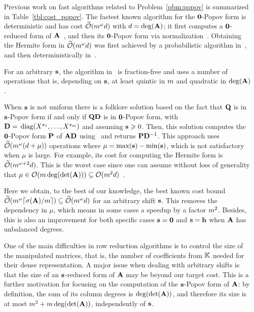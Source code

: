 \documentclass[preprint]{sig-alternate-05-2015}
\begin{document}
Previous work on fast algorithms related to Problem~\ref{pbm:popov} is
summarized in Table~\ref{tbl:cost_popov}. The fastest known algorithm for the
$\unishift$-Popov form is deterministic and has cost $\softO{\rdim^\expmatmul
d}$ with $d = \deg(\mat{A})$; it first computes a $\unishift$-reduced form of
$\mat{A}$~\cite{GuSaStVa12}, and then its $\unishift$-Popov form via
normalization~\cite{SarSto11}. Obtaining the Hermite form in
$\softO{\rdim^\expmatmul d}$ was first achieved by a probabilistic algorithm
in~\cite{Gupta11}, and then deterministically in~\cite{ZhoLab16}.

For an arbitrary $\shifts$, the algorithm in~\cite{BeLaVi06} is fraction-free
and uses a number of operations that is, depending on $\shifts$, at least
quintic in $\rdim$ and quadratic in $\deg(\mat{A})$.

When $\shifts$ is not uniform there is a folklore solution based on the fact
that $\mat{Q}$ is in $\shifts$-Popov form if and only if $\mat{Q} \mat{D}$ is
in $\unishift$-Popov form, with $\mat{D} =
\diag{X^{\shift{1}},\ldots,X^{\shift{\rdim}}}$ and assuming $\shifts \ge 0$.
Then, this solution computes the $\unishift$-Popov form $\mat{P}$ of $\mat{A}
\mat{D}$ using~\cite{GuSaStVa12,SarSto11} and returns $\mat{P} \mat{D}^{-1}$.
This approach uses $\softO{\rdim^\expmatmul (d + \mu)}$ operations where $\mu =
\max(\shifts) - \min(\shifts)$, which is not satisfactory when $\mu$ is large.
For example, its cost for computing the Hermite form is
$\softO{\rdim^{\expmatmul+2} d}$. This is the worst case since one can assume
without loss of generality that $\mu \in \bigO{\rdim \deg(\det(\mat{A}))}
\subseteq \bigO{\rdim^2 d}$~\cite[Appendix A]{JeNeScVi16}.

Here we obtain, to the best of our knowledge, the best known cost bound
$\softO{\rdim^\expmatmul \lceil\degDet/\rdim\rceil} \subseteq
\softO{\rdim^{\expmatmul} d}$ for an arbitrary shift $\shifts$. This removes
the dependency in $\mu$, which means in some cases a speedup by a factor
$\rdim^2$. Besides, this is also an improvement for both specific cases
$\shifts=\unishift$ and $\shifts=\shifts[h]$ when $\mat{A}$ has unbalanced
degrees.

\smallskip
One of the main difficulties in row reduction algorithms is to control the size
of the manipulated matrices, that is, the number of coefficients from $\field$
needed for their dense representation. A major issue when dealing with
arbitrary shifts is that the size of an $\shifts$-reduced form of $\mat{A}$ may
be beyond our target cost. This is a further motivation for focusing on the
computation of the $\shifts$-Popov form of $\mat{A}$: by definition, the sum of
its column degrees is $\deg(\det(\mat{A}))$, and therefore its size is at most
$\rdim^2 + \rdim \deg(\det(\mat{A}))$, independently of $\shifts$.
\end{document}
